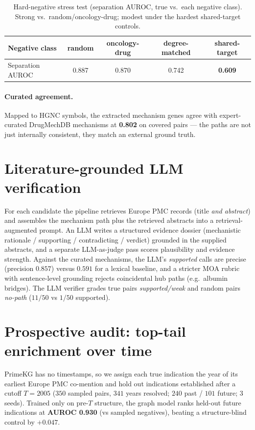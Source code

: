 \documentclass[11pt]{article}
\begin{document}
\begin{table}[t]
\centering\small
\caption{Hard-negative stress test (separation AUROC, true vs.\ each negative class). Strong
vs.\ random/oncology-drug; modest under the hardest shared-target controls.}
\label{tab:hardneg}
\begin{tabular}{lcccc}
\toprule
\textbf{Negative class} & \textbf{random} & \textbf{oncology-drug} & \textbf{degree-matched} & \textbf{shared-target}\\
\midrule
Separation AUROC & 0.887 & 0.870 & 0.742 & \textbf{0.609}\\
\bottomrule
\end{tabular}
\end{table}

\paragraph{Curated agreement.} Mapped to HGNC symbols, the extracted mechanism genes agree
with expert-curated DrugMechDB mechanisms at \textbf{0.802} on covered pairs --- the paths
are not just internally consistent, they match an external ground truth.

\section{Literature-grounded LLM verification}\label{sec:llm}
For each candidate the pipeline retrieves Europe PMC records (title \emph{and abstract}) and
assembles the mechanism path plus the retrieved abstracts into a retrieval-augmented prompt.
An LLM writes a structured evidence dossier (mechanistic rationale / supporting /
contradicting / verdict) grounded in the supplied abstracts, and a separate LLM-as-judge
pass scores plausibility and evidence strength. Against the curated mechanisms, the LLM's
\emph{supported} calls are precise (precision $0.857$) versus $0.591$ for a lexical
baseline, and a stricter MOA rubric with sentence-level grounding rejects coincidental hub
paths (e.g.\ albumin bridges). The LLM verifier grades true pairs \emph{supported/weak} and
random pairs \emph{no-path} ($11/50$ vs $1/50$ supported).

\section{Prospective audit: top-tail enrichment over time}\label{sec:prospective}
PrimeKG has no timestamps, so we assign each true indication the year of its earliest Europe
PMC co-mention and hold out indications established after a cutoff $T=2005$ ($350$ sampled
pairs, $341$ years resolved; $240$ past / $101$ future; 3 seeds). Trained only on pre-$T$
structure, the graph model ranks held-out future indications at \textbf{AUROC 0.930} (vs
sampled negatives), beating a structure-blind control by $+0.047$.
\end{document}
